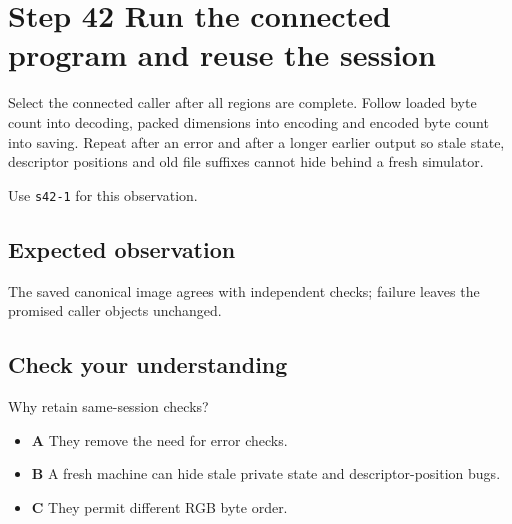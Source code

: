 \section{Step 42 Run the connected program and reuse the session}\label{ppm-s42}

Select the connected caller after all regions are complete. Follow loaded byte count into decoding, packed dimensions into encoding and encoded byte count into saving. Repeat after an error and after a longer earlier output so stale state, descriptor positions and old file suffixes cannot hide behind a fresh simulator.

Use \texttt{s42-1} for this observation.

\subsection{Expected observation}
The saved canonical image agrees with independent checks; failure leaves the promised caller objects unchanged.

\subsection{Check your understanding}
Why retain same-session checks?

\begin{itemize}
  \item \textbf{A} They remove the need for error checks.
  \item \textbf{B} A fresh machine can hide stale private state and descriptor-position bugs.
  \item \textbf{C} They permit different RGB byte order.
\end{itemize}
